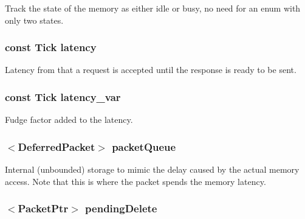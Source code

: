 \label{classSimpleMemory_a099f725f22a344e190121634f53328d8}
Track the state of the memory as either idle or busy, no need for an enum with only two states. \hypertarget{classSimpleMemory_a8291bf96dadb3695aea55321d10c0e77}{
\subsubsection[{latency}]{\setlength{\rightskip}{0pt plus 5cm}const {\bf Tick} {\bf latency}}}
\label{classSimpleMemory_a8291bf96dadb3695aea55321d10c0e77}
Latency from that a request is accepted until the response is ready to be sent. \hypertarget{classSimpleMemory_aa983b5b77f758b06806499ada4568803}{
\subsubsection[{latency\_\-var}]{\setlength{\rightskip}{0pt plus 5cm}const {\bf Tick} {\bf latency\_\-var}}}
\label{classSimpleMemory_aa983b5b77f758b06806499ada4568803}
Fudge factor added to the latency. \hypertarget{classSimpleMemory_ae20fc3a6f9b02bebe5a9bff0c939c1f5}{
\subsubsection[{packetQueue}]{$<${\bf DeferredPacket}$>$ {\bf packetQueue}}}
\label{classSimpleMemory_ae20fc3a6f9b02bebe5a9bff0c939c1f5}
Internal (unbounded) storage to mimic the delay caused by the actual memory access. Note that this is where the packet spends the memory latency. \hypertarget{classSimpleMemory_a21da4bea3554874b557428e4cce5d4a4}{
\subsubsection[{pendingDelete}]{$<${\bf PacketPtr}$>$ {\bf pendingDelete}}}
